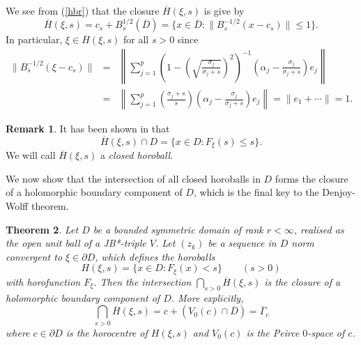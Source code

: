 \documentclass[12pt, twoside]{article}
\newtheorem{theorem}{Theorem}[section]
\theoremstyle{definition}
\newtheorem{remark}[theorem]{Remark}
\numberwithin{equation}{section}
\begin{document}
We see from (\ref{hbr}) that the closure $\overline H(\xi,s)$ is give by
\begin{equation}\label{clos}
\overline H (\xi,s) = c_s + B_s^{1/2}(\overline D) = \{x\in \overline D : \|B_s^{-1/2}(x-c_s)\|\leq 1\}.
\end{equation}
In particular, $\xi\in \overline H(\xi,s)$ for all $s>0$ since
\begin{eqnarray*}
\|B_s^{-1/2}( \xi-c_s) \|&=&  \left\|\sum_{j=1}^p  \left(1- \left(\sqrt{\frac{\sigma_j}{\sigma_j+s}}\right)^2\right)^{-1}
 \left(\alpha_j - \frac{\sigma_j}{\sigma_j+s}\right)e_j \right\|\\
 &=& \left\|\sum_{j=1}^p\left(\frac{\sigma_j +s}{s}\right)  \left(\alpha_j - \frac{\sigma_j}{\sigma_j+s}\right)e_j\right\|
 =\|e_1 + \cdots\|= 1.
 \end{eqnarray*}

\begin{remark}\label{513}It has been shown in \cite[Theorem 5.13]{horo} that
$$\overline H(\xi,s) \cap D = \{x\in D: F_\xi(s) \leq s\}.$$
We will call $\overline H(\xi,s)$  a {\it closed horoball}.

\end{remark}
We now show that the intersection of all closed horoballs in $D$ forms
the closure of a holomorphic boundary component
of $D$, which is the final key to the Denjoy-Wolff theorem.


\begin{theorem}\label{cr1}
Let $D$ be a bounded symmetric domain of rank $r< \infty$, realised as the open
unit ball of a JB*-triple $V$. Let $(z_k)$ be a sequence in $D$ norm convergent to $\xi\in \partial D$,
which defines the horoballs
$$H(\xi, s) = \{x\in D: F_\xi(x)<s\}  \qquad (s>0)$$
with horofunction
$F_\xi$.
Then the intersection $\bigcap_{s>0}\overline H (\xi,s)$
is the closure of a holomorphic boundary component of $D$. More explicitly,
$$\bigcap_{s>0}\overline H (\xi,s)= c + (V_0(c) \cap \overline D) = \overline \Gamma_c$$
where $c\in \partial D$ is the horocentre of $H(\xi,s)$  and $V_0(c)$ is the Peirce $0$-space of $c$.
\end{theorem}
\end{document}
